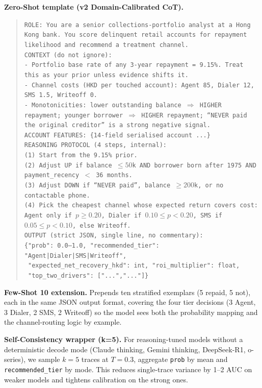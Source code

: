 \documentclass[11pt, a4paper]{article}
\begin{document}
\textbf{Zero-Shot template (v2 Domain-Calibrated CoT).}
\begin{quote}\small
\texttt{ROLE: You are a senior collections-portfolio analyst at a Hong Kong bank. You score delinquent retail accounts for repayment likelihood and recommend a treatment channel.}\\[2pt]
\texttt{CONTEXT (do not ignore):}\\
\texttt{- Portfolio base rate of any 3-year repayment = 9.15\%. Treat this as your prior unless evidence shifts it.}\\
\texttt{- Channel costs (HKD per touched account): Agent 85, Dialer 12, SMS 1.5, Writeoff 0.}\\
\texttt{- Monotonicities: lower outstanding balance $\Rightarrow$ HIGHER repayment; younger borrower $\Rightarrow$ HIGHER repayment; ``NEVER paid the original creditor'' is a strong negative signal.}\\[2pt]
\texttt{ACCOUNT FEATURES: \{14-field serialised account ...\}}\\[2pt]
\texttt{REASONING PROTOCOL (4 steps, internal):}\\
\texttt{(1) Start from the 9.15\% prior.}\\
\texttt{(2) Adjust UP if balance $\le 50$k AND borrower born after 1975 AND payment\_recency $<$ 36 months.}\\
\texttt{(3) Adjust DOWN if ``NEVER paid'', balance $\ge 200$k, or no contactable phone.}\\
\texttt{(4) Pick the cheapest channel whose expected return covers cost: Agent only if $p\!\ge\!0.20$, Dialer if $0.10\!\le\!p\!<\!0.20$, SMS if $0.05\!\le\!p\!<\!0.10$, else Writeoff.}\\[2pt]
\texttt{OUTPUT (strict JSON, single line, no commentary):}\\
\texttt{\{"prob": 0.0--1.0, "recommended\_tier": "Agent|Dialer|SMS|Writeoff",}\\
\texttt{ "expected\_net\_recovery\_hkd": int, "roi\_multiplier": float,}\\
\texttt{ "top\_two\_drivers": ["...","..."]\}}
\end{quote}

\textbf{Few-Shot 10 extension.} Prepends ten stratified exemplars (5 repaid, 5 not), each in the same JSON output format, covering the four tier decisions (3 Agent, 3 Dialer, 2 SMS, 2 Writeoff) so the model sees both the probability mapping and the channel-routing logic by example.

\textbf{Self-Consistency wrapper (k=5).} For reasoning-tuned models without a deterministic decode mode (Claude thinking, Gemini thinking, DeepSeek-R1, o-series), we sample $k\!=\!5$ traces at $T\!=\!0.3$, aggregate \texttt{prob} by mean and \texttt{recommended\_tier} by mode. This reduces single-trace variance by 1--2 AUC on weaker models and tightens calibration on the strong ones.
\end{document}
